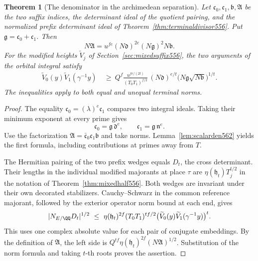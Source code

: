 \documentclass[a4paper,11pt]{article}
\newtheorem{theorem}[proposition]{Theorem}
\theoremstyle{definition}
\theoremstyle{remark}
\numberwithin{equation}{section}
\begin{document}
\begin{theorem}[The denominator in the archimedean separation]
\leavevmode\label{thm:denomheight562}
Let \(\mathfrak c_0,\mathfrak c_1,\mathfrak b,\mathfrak A\)
be the two suffix indices, the determinant ideal of the quotient
pairing, and the normalized prefix determinant ideal of
Theorem~\ref{thm:terminaldivisor556}. Put
\(\mathfrak g=\mathfrak c_0+\mathfrak c_1\). Then
\[
       N\mathfrak A
         =u^{fe}(N\mathfrak d)^{2e}
                         (N\mathfrak g)^2 N\mathfrak b .
\]
For the modified heights \(\widetilde V_j\) of
Section~\ref{sec:mixedsuffix556}, the two arguments of the
orbital integral satisfy
\[
 \begin{split}
 \widetilde V_0(y)\widetilde V_1(\gamma^{-1}y)
 &\ \ge\ Q^f\frac{u^{fe/(2t)}}{(T_0T_1)^{f/2}}\,
       (N\mathfrak d)^{e/t}
       \bigl(N\mathfrak g\sqrt{N\mathfrak b}\bigr)^{1/t}.
 \end{split}
\]
The inequalities apply to both equal and unequal terminal norms.
\end{theorem}
\begin{proof}
The equality \(\mathfrak c_0=(\lambda)^e\mathfrak c_1\)
compares two integral ideals. Taking their minimum exponent
at every prime gives
\[
     \mathfrak c_0=\mathfrak g\,\mathfrak d^e,\qquad
     \mathfrak c_1=\mathfrak g\,\mathfrak n^e .
\]
Use the factorization
\(\mathfrak A=\bar{\mathfrak c}_0\mathfrak c_1\mathfrak b\)
and take norms. Lemma~\ref{lem:scalarden562} yields the first
formula, including contributions at primes away from \(T\).

The Hermitian pairing of the two prefix wedges equals \(D_t\),
the cross determinant. Their lengths in the individual
modified majorants at place \(\tau\) are
\(\eta(\mathfrak h_t)T_j^{t/2}\) in the notation of
Theorem~\ref{thm:mixedhalf556}. Both wedges are invariant under
their own decorated stabilizers. Cauchy--Schwarz in the
common reference majorant, followed by the exterior operator
norm bound at each end, gives
\[
 |N_{E/\QQ}D_t|^{1/2}\ \le\
   \eta(\mathfrak h_t)^{2f}(T_0T_1)^{tf/2}
           \bigl(\widetilde V_0(y)\widetilde V_1(\gamma^{-1}y)\bigr)^t .
\]
This uses one complex absolute value for each pair of conjugate
embeddings. By the definition of \(\mathfrak A\), the left
side is \(Q^{tf}\eta(\mathfrak h_t)^{2f}(N\mathfrak A)^{1/2}\).
Substitution of the norm formula and taking \(t\)-th roots
proves the assertion.
\end{proof}
\end{document}
